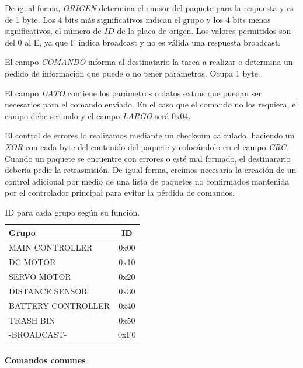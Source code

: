 De igual forma, \emph{ORIGEN} determina el emisor del paquete para la respuesta y es de 1 byte.
Los 4 bits m\'as significativos indican el grupo y los 4 bits menos significativos, el n\'umero de $ID$ de la placa de origen.
Los valores permitidos son del $0$ al E, ya que F indica broadcast y no es v\'alida una respuesta broadcast.

El campo \emph{COMANDO} informa al destinatario la tarea a realizar o determina un pedido de informaci\'on que puede o no
tener par\'ametros.
Ocupa 1 byte.

El campo \emph{DATO} contiene los par\'ametros o datos extras que puedan ser necesarios para el comando enviado.
En el caso que el comando no los requiera, el campo debe ser nulo y el campo \emph{LARGO} ser\'a 0x04.

El control de errores lo realizamos mediante un checksum calculado, haciendo un \emph{XOR} con cada byte del contenido del paquete
y coloc\'andolo en el campo \emph{CRC}.
Cuando un paquete se encuentre con errores o est\'e mal formado, el destinarario deber\'ia pedir la retrasmisi\'on.
De igual forma, cre\'imos necesaria la creaci\'on de un control adicional por medio de una lista de paquetes no confirmados mantenida
por el controlador principal para evitar la p\'erdida de comandos.

\begin{table}[h]
	\begin{center}
		\begin{tabular}{|l|c|}
			\hline
			Grupo & ID \\
			\hline
			MAIN CONTROLLER & 0x00 \\
			\hline
			DC MOTOR & 0x10 \\
			\hline
			SERVO MOTOR & 0x20 \\
			\hline
			DISTANCE SENSOR & 0x30 \\
			\hline
			BATTERY CONTROLLER & 0x40 \\
			\hline
			TRASH BIN & 0x50 \\
			\hline
			-BROADCAST- & 0xF0 \\
			\hline
		\end{tabular}
		\caption{ID para cada grupo seg\'un su funci\'on.}
		\label{hT_comm_protocolo_grupos}
	\end{center}
\end{table}

\paragraph{Comandos comunes}
\label{h_comm_protocolo_comandosComunes}

